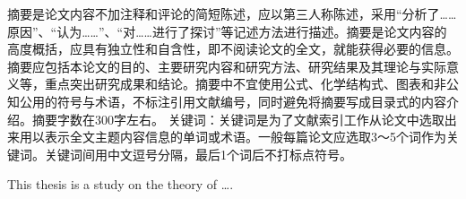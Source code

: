 %
%
%
%



\begin{cnabstract}
摘要是论文内容不加注释和评论的简短陈述，应以第三人称陈述，采用“分析了……原因”、“认为……”、“对……进行了探讨”等记述方法进行描述。摘要是论文内容的高度概括，应具有独立性和自含性，即不阅读论文的全文，就能获得必要的信息。摘要应包括本论文的目的、主要研究内容和研究方法、研究结果及其理论与实际意义等，重点突出研究成果和结论。摘要中不宜使用公式、化学结构式、图表和非公知公用的符号与术语，不标注引用文献编号，同时避免将摘要写成目录式的内容介绍。摘要字数在300字左右。
关键词：关键词是为了文献索引工作从论文中选取出来用以表示全文主题内容信息的单词或术语。一般每篇论文应选取3～5个词作为关键词。关键词间用中文逗号分隔，最后1个词后不打标点符号。

\end{cnabstract}
\par
\vspace*{2em} %


\cleardoublepage 


\begin{enabstract}
This thesis is a study on the theory of \dots.

\end{enabstract}
\par
\vspace*{2em}

 \cleardoublepage 
 
